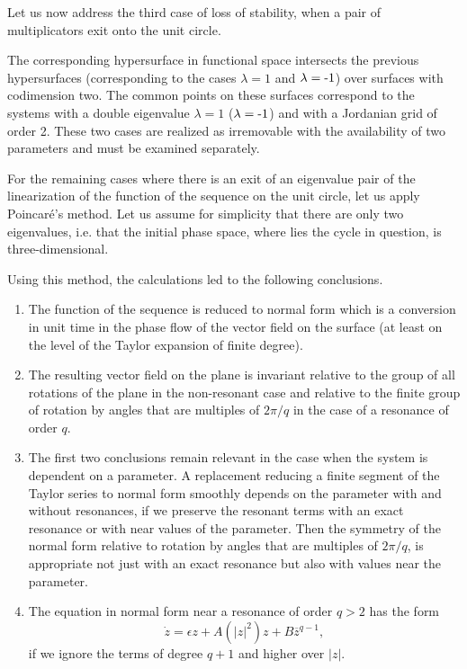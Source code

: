 \documentclass[12pt]{amsart}
\begin{document}
Let us now address the third case of loss of stability, when a pair of
multiplicators exit onto the unit circle.

The corresponding hypersurface in functional space intersects the previous
hypersurfaces (corresponding to the cases $\lambda=1$ and $\lambda=\text-1$)
over surfaces with codimension two.
The common points on these surfaces correspond to the systems with a double
eigenvalue $\lambda=1$ ($\lambda=\text-1$) and with a Jordanian grid of order 2.
These two cases are realized as irremovable with the availability of two
parameters and must be examined separately.

For the remaining cases where there is an exit of an eigenvalue pair of the
linearization of the function of the sequence on the unit circle, let us apply
Poincar\'e's method.
Let us assume for simplicity that there are only two eigenvalues, i.e. that the
initial phase space, where lies the cycle in question, is three-dimensional.

Using this method, the calculations led to the following conclusions.
\begin{enumerate}
\item The function of the sequence is reduced to normal form which is a
conversion in unit time in the phase flow of the vector field on the surface (at
least on the level of the Taylor expansion of finite degree).
\item The resulting vector field on the plane is invariant relative to the group
of all rotations of the plane in the non-resonant case and relative to the
finite group of rotation by angles that are multiples of $2\pi/q$ in the case of
a resonance of order $q$.
\item The first two conclusions remain relevant in the case when the system is
dependent on a parameter.
A replacement reducing a finite segment of the Taylor series to normal form
smoothly depends on the parameter with and without resonances, if we preserve
the resonant terms with an exact resonance or with near values of the parameter.
Then the symmetry of the normal form relative to rotation by angles that are
multiples of $2\pi/q$, is appropriate not just with an exact resonance but also
with values near the parameter.
\item The equation in normal form near a resonance of order $q>2$ has the form
$$\dot z=\epsilon z+A(|z|^2)z+B\overline z^{q-1},$$
if we ignore the terms of degree $q+1$ and higher over $|z|$.
\end{enumerate}
\end{document}
